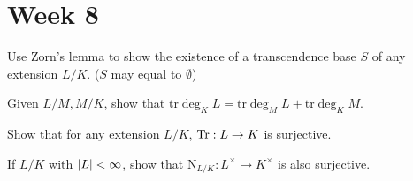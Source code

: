 
\section{Week 8}

\begin{exercise} 
  Use Zorn's lemma to show the existence of a transcendence base $S$ of any 
  extension $L/K$. ($S$ may equal to $\emptyset$)
\end{exercise}

\begin{exercise}
  Given $L/M, M/K$, show that $\mathrm{tr} \deg_K L = \mathrm{tr} \deg_M L
  + \mathrm{tr} \deg_K M$.
\end{exercise}

\begin{exercise}
  Show that for any extension $L/K$, $\operatorname{Tr} : L \to K$ is surjective.
\end{exercise}

\begin{exercise}
  If $L/K$ with $\lvert L\rvert < \infty$, show that $\mathrm{N}_{L/K} : L^\times \to K^\times$
  is also surjective.
\end{exercise}
